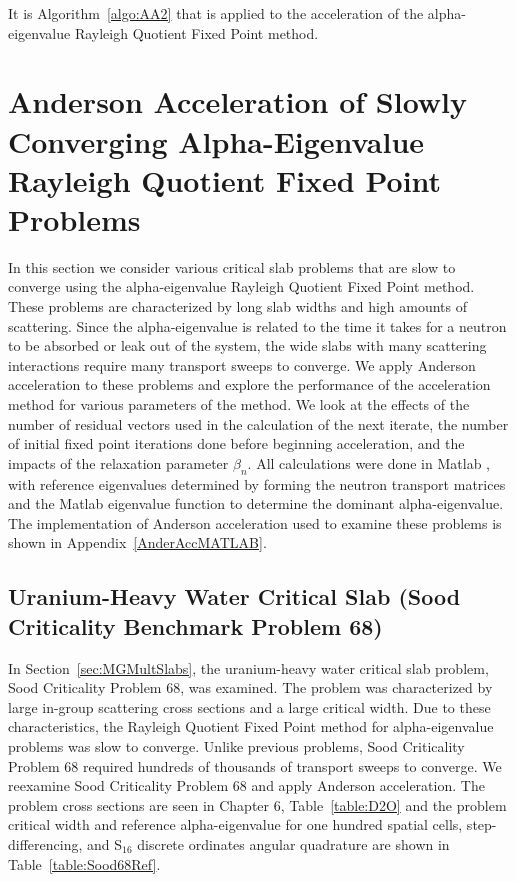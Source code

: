 It is Algorithm~\ref{algo:AA2} that is applied to the acceleration of the alpha-eigenvalue Rayleigh Quotient Fixed Point method.

\section{Anderson Acceleration of Slowly Converging Alpha-Eigenvalue Rayleigh Quotient Fixed Point Problems}

In this section we consider various critical slab problems that are slow to converge using the alpha-eigenvalue Rayleigh Quotient Fixed Point method. These problems are characterized by long slab widths and high amounts of scattering. Since the alpha-eigenvalue is related to the time it takes for a neutron to be absorbed or leak out of the system, the wide slabs with many scattering interactions require many transport sweeps to converge. We apply Anderson acceleration to these problems and explore the performance of the acceleration method for various parameters of the method. We look at the effects of the number of residual vectors used in the calculation of the next iterate, the number of initial fixed point iterations done before beginning acceleration, and the impacts of the relaxation parameter $\beta_{n}$. All calculations were done in Matlab \cite{MATLAB:2019}, with reference eigenvalues determined by forming the neutron transport matrices and the Matlab eigenvalue function to determine the dominant alpha-eigenvalue. The implementation of Anderson acceleration used to examine these problems is shown in Appendix~\ref{AnderAccMATLAB}.

\subsection{Uranium-Heavy Water Critical Slab (Sood Criticality Benchmark Problem 68)}

In Section~\ref{sec:MGMultSlabs}, the uranium-heavy water critical slab problem, Sood Criticality Problem 68, was examined. The problem was characterized by large in-group scattering cross sections and a large critical width. Due to these characteristics, the Rayleigh Quotient Fixed Point method for alpha-eigenvalue problems was slow to converge. Unlike previous problems, Sood Criticality Problem 68 required hundreds of thousands of transport sweeps to converge. We reexamine Sood Criticality Problem 68 and apply Anderson acceleration. The problem cross sections are seen in Chapter 6, Table~\ref{table:D2O} and the problem critical width and reference alpha-eigenvalue for one hundred spatial cells, step-differencing, and S$_{16}$ discrete ordinates angular quadrature are shown in Table~\ref{table:Sood68Ref}.

